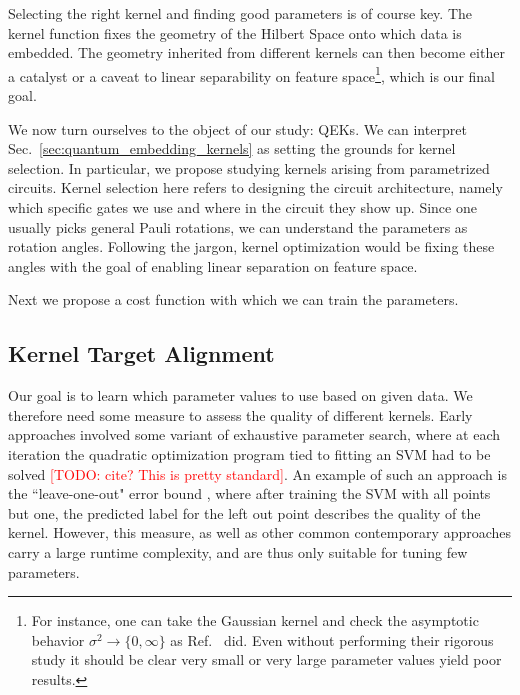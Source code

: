 \documentclass[twocolumn,superscriptaddress,nofootinbib]{revtex4-2}
\newcommand{\todo}[1]{\textcolor{red}{[TODO: #1]}}
\begin{document}
    Selecting the right kernel and finding good parameters is of course key.
    The kernel function fixes the geometry of the Hilbert Space onto which data is embedded.
    The geometry inherited from different kernels can then become either a catalyst or a caveat to linear separability on feature space\footnote{
    For instance, one can take the Gaussian kernel and check the asymptotic behavior $\sigma^2\to\{0,\infty\}$ as Ref.~\cite{keerthiLin} did.
    Even without performing their rigorous study it should be clear very small or very large parameter values yield poor results.}, which is our final goal.
    
    We now turn ourselves to the object of our study: \acp{QEK}.
    We can interpret Sec.~\ref{sec:quantum_embedding_kernels} as setting the grounds for kernel selection.
    In particular, we propose studying kernels arising from parametrized circuits.
    Kernel selection here refers to designing the circuit architecture, namely which specific gates we use and where in the circuit they show up.
    Since one usually picks general Pauli rotations, we can understand the parameters as rotation angles.
    Following the jargon, kernel optimization would be fixing these angles with the goal of enabling linear separation on feature space.
    
    Next we propose a cost function with which we can train the parameters.
    
\subsection{Kernel Target Alignment}\label{ssec:target_kernel_alignment}

    Our goal is to learn which parameter values to use based on given data.
    We therefore need some measure to assess the quality of different kernels.
    Early approaches involved some variant of exhaustive parameter search, where at each iteration the quadratic optimization program tied to fitting an \ac{SVM} had to be solved \todo{cite? This is pretty standard}.
    An example of such an approach is the ``leave-one-out" error bound \cite{scholkopf2002learning}, where after training the \ac{SVM} with all points but one, the predicted label for the left out point describes the quality of the kernel.
    However, this measure, as well as other common contemporary approaches carry a large runtime complexity, and are thus only suitable for tuning few parameters.
    
\end{document}
